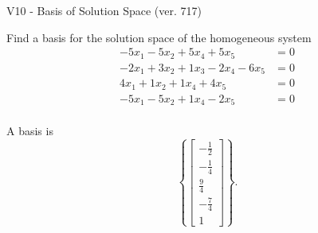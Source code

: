 \begin{exercise}
  \begin{exerciseTitle}V10 - Basis of Solution Space (ver. 717)\end{exerciseTitle}
  \begin{exerciseStatement}
    Find a basis for the solution space of the homogeneous system 
\begin{align*}
 -5 x_ 1 -5 x_ 2 + 5 x_ 4 + 5 x_ 5 &= 0  \\ 
  -2 x_ 1 + 3 x_ 2 + 1 x_ 3 -2 x_ 4 -6 x_ 5 &= 0  \\ 
  4 x_ 1 + 1 x_ 2 + 1 x_ 4 + 4 x_ 5 &= 0  \\ 
  -5 x_ 1 -5 x_ 2 + 1 x_ 4 -2 x_ 5 &= 0  \\ 
 \end{align*}


 
  \end{exerciseStatement}

  \begin{exerciseAnswer}
   A basis is   
\[\left\{\left[\begin{array}{c}
-\frac{1}{2} \\
-\frac{1}{4} \\
\frac{9}{4} \\
-\frac{7}{4} \\
1
\end{array}\right]\right\}.\]

  


  \end{exerciseAnswer}
\end{exercise}